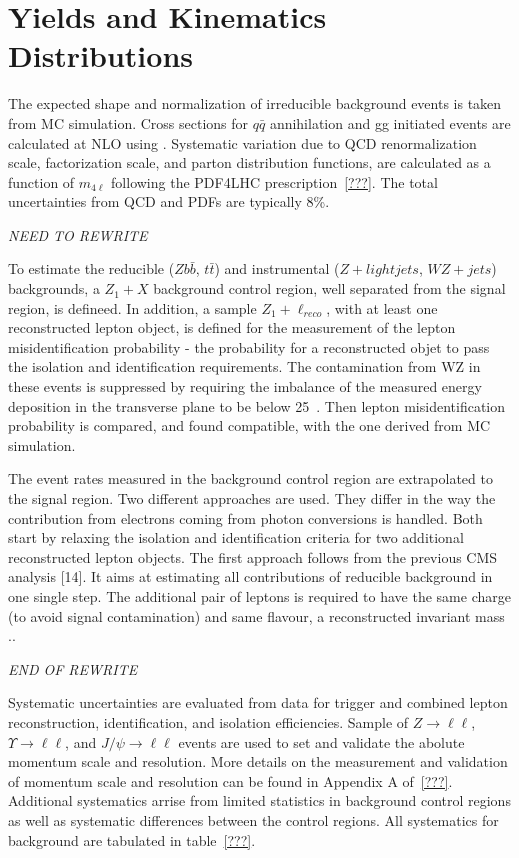 \section{Yields and Kinematics Distributions}
\label{sec:HZZ4lyields}

The expected shape and normalization of irreducible 
background events is taken from MC simulation.  Cross sections
for $q\bar{q}$ annihilation and gg initiated events are 
calculated at NLO using \MCFM.  Systematic variation due to 
QCD renormalization scale, factorization scale, and parton 
distribution functions, are calculated as a function of $m_{4\ell}$
following the PDF4LHC prescription~\ref{???}. The total 
uncertainties from QCD and PDFs are typically 8\%.  

{\it NEED TO REWRITE}

To estimate the reducible ($Zb\bar{b}$, $t\bar{t}$) and 
instrumental ($Z+light jets$, $WZ+jets$) backgrounds, a 
$Z_1+X$ background control region, well separated from the 
signal region, is defineed.  In addition, a sample $Z_1+\ell_{reco}$,
with at least one reconstructed lepton object, is defined for the
measurement of the lepton misidentification probability - the
probability for a reconstructed objet to pass the isolation and 
identification requirements.  The contamination from WZ in these
events is suppressed by requiring the imbalance of the measured
energy deposition in the transverse plane to be below 25~\GeV. 
Then lepton misidentification probability is compared, and found
compatible, with the one derived from MC simulation.

The event rates measured in the background control region are
extrapolated to the signal region.  Two different approaches are
used.  They differ in the way the contribution from electrons
coming from photon conversions is handled.  Both start by 
relaxing the isolation and identification criteria for two 
additional reconstructed lepton objects.  The first approach 
follows from the previous CMS analysis [14].  It aims at
estimating all contributions of reducible background in one 
single step.  The additional pair of leptons is required to have
the same charge (to avoid signal contamination) and same flavour,
a reconstructed invariant mass .. 

{\it END OF REWRITE}

Systematic uncertainties are evaluated from data for trigger 
and combined lepton reconstruction, identification, and
isolation efficiencies.  Sample of $Z\to\ell\ell$, 
$\Upsilon\to\ell\ell$, and $J/\psi\to\ell\ell$ events are used
to set and validate the abolute momentum scale and resolution.  
More details on the measurement and validation of momentum 
scale and resolution can be found in Appendix A of~\ref{???}.
Additional systematics arrise from limited statistics in 
background control regions as well as systematic differences 
between the control regions.  All systematics for background
are tabulated in table~\ref{???}.

